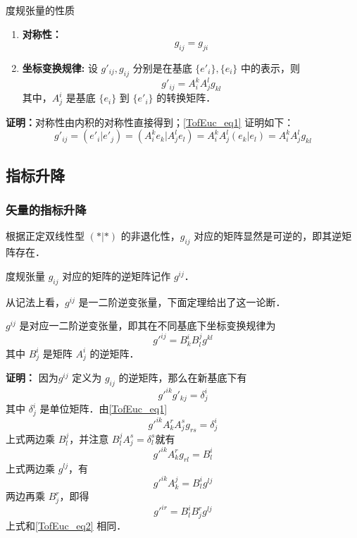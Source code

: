 \begin{theorem}{度规张量的性质}
\begin{enumerate}
\item \textbf{对称性：}\begin{equation}
g_{ij}=g_{ji}
\end{equation}
\item \textbf{坐标变换规律:} 设 $g'_{ij},g_{ij}$ 分别是在基底 $\{e'_i\},\{e_i\}$ 中的表示，则
\begin{equation}\label{TofEuc_eq1}
g'_{ij}=A^k_{i} A^l_{j}g_{kl}
\end{equation}
其中，$A^i_j$ 是基底 $\{e_i\}$ 到 $\{e'_i\}$ 的转换矩阵．
\end{enumerate}
\end{theorem}
\textbf{证明：}对称性由内积的对称性直接得到；\autoref{TofEuc_eq1} 证明如下：
\begin{equation}
g'_{ij}=(e'_i|e'_j)=(A^k_i e_k|A^l_j e_l)=A^k_{i} A^l_{j}(e_k|e_l)=A^k_{i} A^l_{j}g_{kl}
\end{equation}

\subsection{指标升降}
\subsubsection{矢量的指标升降}
根据正定双线性型 $(*|*)$ 的非退化性，$g_{ij}$ 对应的矩阵显然是可逆的，即其逆矩阵存在．
\begin{definition}{}
度规张量 $g_{ij}$ 对应的矩阵的逆矩阵记作 $g^{ij}$．
\end{definition}
从记法上看，$g^{ij}$ 是一二阶逆变张量，下面定理给出了这一论断．
\begin{theorem}{}
$g^{ij}$ 是对应一二阶逆变张量，即其在不同基底下坐标变换规律为
\begin{equation}\label{TofEuc_eq2}
g'^{ij}=B^i_kB^j_l g^{kl}
\end{equation}
其中 $B^i_j$ 是矩阵 $A^i_j$ 的逆矩阵．
\end{theorem} 

\textbf{证明：}
因为$g^{ij}$ 定义为 $g_{ij}$ 的逆矩阵，那么在新基底下有 \begin{equation}
g'^{ik}g'_{kj}=\delta^i_j
\end{equation}
其中 $\delta^i_j$ 是单位矩阵．由\autoref{TofEuc_eq1} 
\begin{equation}
g'^{ik}A^r_k A^s_j g_{rs}=\delta^i_j
\end{equation}
上式两边乘 $B^j_l$，并注意 $B^j_lA^s_j=\delta^s_l$就有
\begin{equation}
g'^{ik}A^r_k g_{rl}=B^
i_l
\end{equation}
上式两边乘 $g^{lj}$，有
\begin{equation}
g'^{ik}A^j_k=B^i_lg^{lj}
\end{equation}
两边再乘 $B^r_j$，即得
\begin{equation}
g'^{ir}=B^i_lB^r_jg^{lj}
\end{equation}
上式和\autoref{TofEuc_eq2} 相同．

